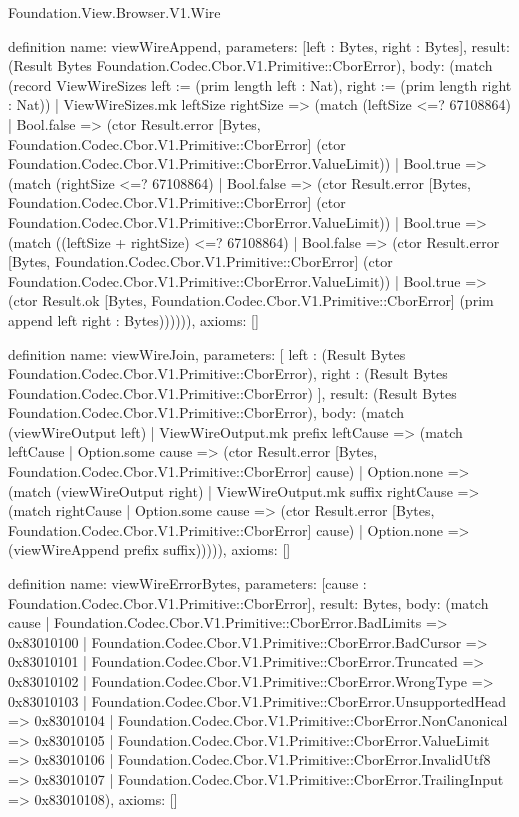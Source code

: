 \begin{lexlean}{Foundation.View.Browser.V1.Wire}
\begin{semanticmodule}
definition{
  name: viewWireAppend,
  parameters: [left : Bytes, right : Bytes],
  result: (Result Bytes Foundation.Codec.Cbor.V1.Primitive::CborError),
  body: (match (record ViewWireSizes {left := (prim length left : Nat), right := (prim length right : Nat)})
    | ViewWireSizes.mk leftSize rightSize => (match (leftSize <=? 67108864)
      | Bool.false => (ctor Result.error [Bytes, Foundation.Codec.Cbor.V1.Primitive::CborError] (ctor Foundation.Codec.Cbor.V1.Primitive::CborError.ValueLimit))
      | Bool.true => (match (rightSize <=? 67108864)
        | Bool.false => (ctor Result.error [Bytes, Foundation.Codec.Cbor.V1.Primitive::CborError] (ctor Foundation.Codec.Cbor.V1.Primitive::CborError.ValueLimit))
        | Bool.true => (match ((leftSize + rightSize) <=? 67108864)
          | Bool.false => (ctor Result.error [Bytes, Foundation.Codec.Cbor.V1.Primitive::CborError] (ctor Foundation.Codec.Cbor.V1.Primitive::CborError.ValueLimit))
          | Bool.true => (ctor Result.ok [Bytes, Foundation.Codec.Cbor.V1.Primitive::CborError] (prim append left right : Bytes)))))),
  axioms: []
}

definition{
  name: viewWireJoin,
  parameters: [
    left : (Result Bytes Foundation.Codec.Cbor.V1.Primitive::CborError),
    right : (Result Bytes Foundation.Codec.Cbor.V1.Primitive::CborError)
  ],
  result: (Result Bytes Foundation.Codec.Cbor.V1.Primitive::CborError),
  body: (match (viewWireOutput left)
    | ViewWireOutput.mk prefix leftCause => (match leftCause
      | Option.some cause => (ctor Result.error [Bytes, Foundation.Codec.Cbor.V1.Primitive::CborError] cause)
      | Option.none => (match (viewWireOutput right)
        | ViewWireOutput.mk suffix rightCause => (match rightCause
          | Option.some cause => (ctor Result.error [Bytes, Foundation.Codec.Cbor.V1.Primitive::CborError] cause)
          | Option.none => (viewWireAppend prefix suffix))))),
  axioms: []
}

definition{
  name: viewWireErrorBytes,
  parameters: [cause : Foundation.Codec.Cbor.V1.Primitive::CborError],
  result: Bytes,
  body: (match cause
    | Foundation.Codec.Cbor.V1.Primitive::CborError.BadLimits => 0x83010100
    | Foundation.Codec.Cbor.V1.Primitive::CborError.BadCursor => 0x83010101
    | Foundation.Codec.Cbor.V1.Primitive::CborError.Truncated => 0x83010102
    | Foundation.Codec.Cbor.V1.Primitive::CborError.WrongType => 0x83010103
    | Foundation.Codec.Cbor.V1.Primitive::CborError.UnsupportedHead => 0x83010104
    | Foundation.Codec.Cbor.V1.Primitive::CborError.NonCanonical => 0x83010105
    | Foundation.Codec.Cbor.V1.Primitive::CborError.ValueLimit => 0x83010106
    | Foundation.Codec.Cbor.V1.Primitive::CborError.InvalidUtf8 => 0x83010107
    | Foundation.Codec.Cbor.V1.Primitive::CborError.TrailingInput => 0x83010108),
  axioms: []
}


\end{semanticmodule}
\end{lexlean}
